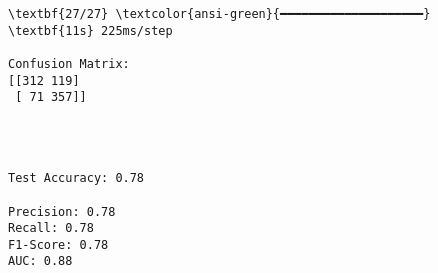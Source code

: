 \documentclass[11pt]{article}
\begin{document}
    \begin{Verbatim}[commandchars=\\\{\}]
\textbf{27/27} \textcolor{ansi-green}{━━━━━━━━━━━━━━━━━━━━} \textbf{11s} 225ms/step

Confusion Matrix:
[[312 119]
 [ 71 357]]
    \end{Verbatim}

    \begin{center}
    \end{center}
    { \hspace*{\fill} \\}
    
    \begin{Verbatim}[commandchars=\\\{\}]

Test Accuracy: 0.78

Precision: 0.78
Recall: 0.78
F1-Score: 0.78
AUC: 0.88
    \end{Verbatim}

    \begin{center}
    \end{center}
    { \hspace*{\fill} \\}
    

    
    
    
\end{document}
